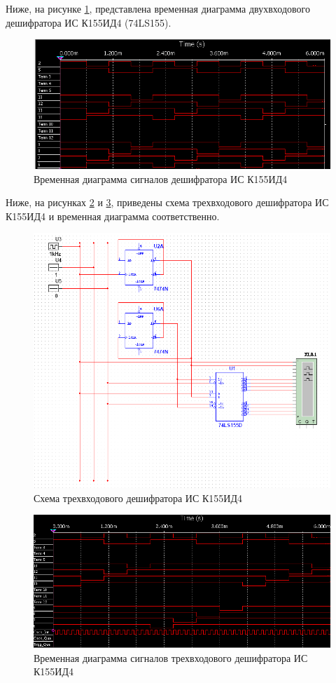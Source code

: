 \pagebreak

Ниже, на рисунке \ref{fig:2-74ls-out}, представлена временная диаграмма двухвходового дешифратора ИС К155ИД4 (74LS155).

\begin{figure}[ht]
	\centering
	\includegraphics[width=0.7\linewidth]{img/2-74LS-out}
	\caption{Временная диаграмма сигналов дешифратора ИС К155ИД4}
	\label{fig:2-74ls-out}
\end{figure}

\pagebreak

Ниже, на рисунках \ref{fig:3-74ls1} и \ref{fig:3-74ls1-out}, приведены схема трехвходового дешифратора ИС К155ИД4 и временная диаграмма соответственно.

\begin{figure}[ht]
	\centering
	\includegraphics[width=\linewidth]{img/3-74LS1}
	\caption{Схема трехвходового дешифратора ИС К155ИД4}
	\label{fig:3-74ls1}
\end{figure}

\pagebreak

\begin{figure}[ht]
	\centering
	\includegraphics[width=0.7\linewidth]{img/3-74LS1-out}
	\caption{Временная диаграмма сигналов трехвходового дешифратора ИС К155ИД4}
	\label{fig:3-74ls1-out}
\end{figure}

